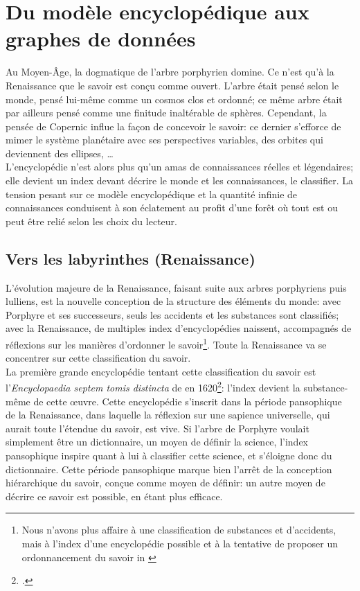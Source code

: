 \section{\label{III-A-1}Du modèle encyclopédique aux graphes de données}

Au Moyen-Âge, la dogmatique de l'arbre porphyrien domine. Ce n'est qu'à la Renaissance que le savoir est conçu comme ouvert. L'arbre était pensé selon le monde, pensé lui-même comme un cosmos clos et ordonné; ce même arbre était par ailleurs pensé comme une finitude inaltérable de sphères. Cependant, la pensée de Copernic influe la façon de concevoir le savoir: ce dernier s'efforce de mimer le système planétaire avec ses perspectives variables, des orbites qui deviennent des ellipses, \dots~\\

L'encyclopédie n'est alors plus qu'un amas de connaissances réelles et légendaires; elle devient un index devant décrire le monde et les connaissances, le classifier. La tension pesant sur ce modèle encyclopédique et la quantité infinie de connaissances conduisent à son éclatement au profit d'une forêt où tout est ou peut être relié selon les choix du lecteur.

\subsection{\label{III-A-1-a}Vers les labyrinthes (Renaissance)}

L'évolution majeure de la Renaissance, faisant suite aux arbres porphyriens puis lulliens, est la nouvelle conception de la structure des éléments du monde: avec Porphyre et ses successeurs, seuls les accidents et les substances sont classifiés; avec la Renaissance, de multiples index d'encyclopédies naissent, accompagnés de réflexions sur les manières d'ordonner le savoir\footnote{\og Nous n'avons plus affaire à une classification de substances et d'accidents, mais à l'index d'une encyclopédie possible et à la tentative de proposer un ordonnancement du savoir\fg{} in \cite{eco_arbre_2010}}. Toute la Renaissance va se concentrer sur cette classification du savoir.\\

La première grande encyclopédie tentant cette classification du savoir est l'\textit{Encyclopaedia septem tomis distincta} de  en 1620\footcite{alsted_encyclopaedia_1630}: l'index devient la substance-même de cette œuvre. Cette encyclopédie s'inscrit dans la période pansophique de la Renaissance, dans laquelle la réflexion sur une sapience universelle, qui aurait toute l'étendue du savoir, est vive. Si l'arbre de Porphyre voulait simplement être un dictionnaire, un moyen de définir la science, l'index pansophique inspire quant à lui à classifier cette science, et s'éloigne donc du dictionnaire. Cette période pansophique marque bien l'arrêt de la conception hiérarchique du savoir, conçue comme moyen de définir: un autre moyen de décrire ce savoir est possible, en étant plus efficace.\\


